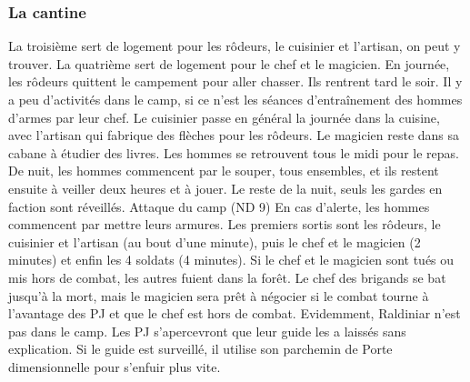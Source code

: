 \documentclass[a4paper,10pt,openany]{book}
\begin{document}
\begin{multicols}{2}
\subsubsection{La cantine} 
La
troisième sert de logement pour les rôdeurs, le cuisinier et l’artisan, on peut y trouver.
La quatrième sert de logement pour le chef et le magicien.
En journée, les rôdeurs quittent le campement pour aller chasser. Ils rentrent tard le soir. Il y a peu d’activités dans le camp, si ce n’est les séances d’entraînement des hommes d’armes par leur chef. Le cuisinier passe en général la journée dans la cuisine, avec l’artisan qui fabrique des flèches pour les rôdeurs. Le magicien reste dans sa cabane à étudier des livres. Les hommes se retrouvent tous le midi pour le repas.
De nuit, les hommes commencent par le souper, tous ensembles, et ils restent ensuite à veiller deux heures et à jouer. Le reste de la nuit, seuls les gardes en faction sont réveillés.
Attaque du camp (ND 9)
En cas d’alerte, les hommes commencent par mettre leurs armures. Les premiers sortis sont les rôdeurs, le cuisinier et l’artisan (au bout d’une minute), puis le chef et le magicien (2 minutes) et enfin les 4 soldats (4 minutes).
Si le chef et le magicien sont tués ou mis hors de combat, les autres fuient dans la forêt.
Le chef des brigands se bat jusqu’à la mort, mais le magicien sera prêt à négocier si le combat tourne à l’avantage des PJ et que le chef est hors de combat.
Evidemment, Raldiniar n’est pas dans le camp. Les PJ s’apercevront que leur guide les a laissés sans explication. Si le guide est surveillé, il utilise son parchemin de Porte dimensionnelle pour s’enfuir plus vite.

\end{multicols}


\end{document}
